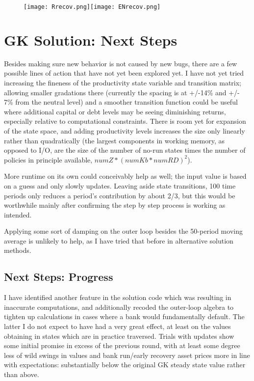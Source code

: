 \documentclass[english]{article}
\begin{document}
\begin{figure}[H]
\centering
		\texttt{[image: Rrecov.png]}\texttt{[image: ENrecov.png]}
\end{figure}

\section{GK Solution: Next Steps}
Besides making sure new behavior is not caused by new bugs, there are a few possible lines of action 
that have not yet been explored yet. I have not yet tried increasing the fineness of the productivity 
state variable and transition matrix; allowing smaller gradations there (currently the spacing is at +/-14\%
 and +/- 7\% from the neutral level) and a smoother transition function could be useful where additional 
capital or debt levels may be seeing diminishing returns, especially relative to computational constraints. 
There is room yet for expansion of the state space, and adding productivity levels increases the size 
only linearly rather than quadratically (the largest components in working memory, as opposed to I/O, 
are the size of the number of no-run states times the number of policies in principle available, 
$numZ*(numKb*numRD)^2$). 

More runtime on its own could conceivably help as well; the input value is based on a guess and only 
slowly updates. Leaving aside state transitions, 100 time periods only reduces a period's contribution 
by about 2/3, but this would be worthwhile mainly after confirming the step by step process is working as 
intended.

Applying some sort of damping on the outer loop besides the 50-period moving average is unlikely to 
help, as I have tried that before in alternative solution methods. 

\subsection{Next Steps: Progress}
I have identified another feature in the solution code which was resulting in inaccurate computations, 
and additionally recoded the outer-loop algebra to tighten up calculations in cases where a bank would 
fundamentally default. The latter I do not expect to have had a very great effect, at least on the values
obtaining in states which are in practice traversed. Trials with updates show some initial promise in 
excess of the previous round, with at least some degree less of wild swings in values and bank run/early recovery asset prices
more in line with expectations: substantially below the original GK steady state value rather than above.
\end{document}
